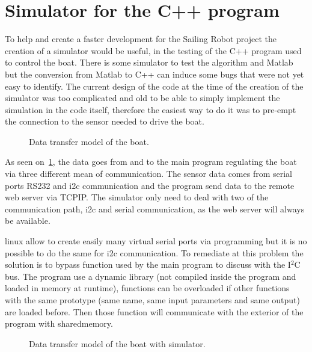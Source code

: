 \section{Simulator for the \gls{C++} program}

To help and create a faster development for the Sailing Robot project the creation of a simulator would be useful, in the testing of the \gls{C++} program used to control the boat. 
There is some simulator to test the algorithm and Matlab but the conversion from Matlab to C++ can induce some bugs that were not yet easy to identify.
The current design of the code at the time of the creation of the simulator was too complicated and old to be able to simply implement the simulation in the code itself, therefore the easiest way to do it was to pre-empt the connection to the sensor needed to drive the boat.

\begin{figure}[H]
\centering
{} %
{

}
\caption{Data transfer model of the boat.}
\label{fig:model_boat_}
\end{figure}

As seen on~\ref{fig:model_boat_}, the data goes from and to the main program regulating the boat via three different mean of communication.
The sensor data comes from serial ports \gls{RS232} and \gls{i2c} communication and the program send data to the remote web server via \gls{TCPIP}. The simulator only need to deal with two of the communication path, \gls{i2c} and serial communication, as the web server will always be available. 

\gls{linux} allow to create easily many virtual serial ports via programming but it is no possible to do the same for \gls{i2c} communication. To remediate at this problem the solution is to bypass function used by the main program to discuss with the I$^2$C bus. The program use a dynamic library (not compiled inside the program  and loaded in memory at runtime), functions can be overloaded if other functions with the same prototype (same name, same input parameters and same output) are loaded before. Then those function will communicate with the exterior of the program  with \gls{sharedmemory}.

\begin{figure}[H]
\centering
{} %
{

}
\caption{Data transfer model of the boat with simulator.}
\label{fig:model_boat_sim}
\end{figure}

